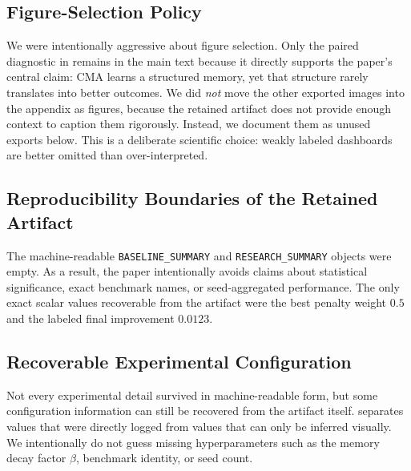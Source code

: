 \documentclass{article} %
\begin{document}
\subsection{Figure-Selection Policy}

We were intentionally aggressive about figure selection. Only the paired diagnostic in  remains in the main text because it directly supports the paper's central claim: CMA learns a structured memory, yet that structure rarely translates into better outcomes. We did \emph{not} move the other exported images into the appendix as figures, because the retained artifact does not provide enough context to caption them rigorously. Instead, we document them as unused exports below. This is a deliberate scientific choice: weakly labeled dashboards are better omitted than over-interpreted.

\subsection{Reproducibility Boundaries of the Retained Artifact}

The machine-readable \texttt{BASELINE\_SUMMARY} and \texttt{RESEARCH\_SUMMARY} objects were empty. As a result, the paper intentionally avoids claims about statistical significance, exact benchmark names, or seed-aggregated performance. The only exact scalar values recoverable from the artifact were the best penalty weight $0.5$ and the labeled final improvement $0.0123$.

\subsection{Recoverable Experimental Configuration}

Not every experimental detail survived in machine-readable form, but some configuration information can still be recovered from the artifact itself.  separates values that were directly logged from values that can only be inferred visually. We intentionally do not guess missing hyperparameters such as the memory decay factor $\beta$, benchmark identity, or seed count.
\end{document}
